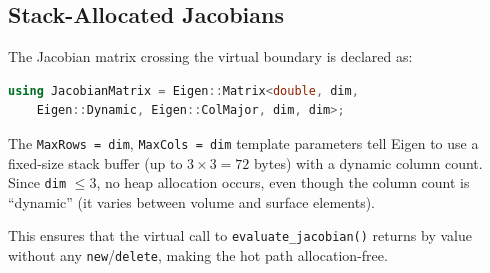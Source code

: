 \subsection{Stack-Allocated Jacobians}

The Jacobian matrix crossing the virtual boundary is declared as:
\begin{lstlisting}[language=C++]
using JacobianMatrix = Eigen::Matrix<double, dim,
    Eigen::Dynamic, Eigen::ColMajor, dim, dim>;
\end{lstlisting}
The \texttt{MaxRows = dim}, \texttt{MaxCols = dim} template parameters tell
Eigen to use a fixed-size stack buffer (up to $3 \times 3 = 72$ bytes) with
a dynamic column count.  Since \texttt{dim} $\le 3$, no heap allocation
occurs, even though the column count is ``dynamic'' (it varies between volume
and surface elements).

This ensures that the virtual call to \texttt{evaluate\_jacobian()} returns by
value without any \texttt{new}/\texttt{delete}, making the hot path
allocation-free.
